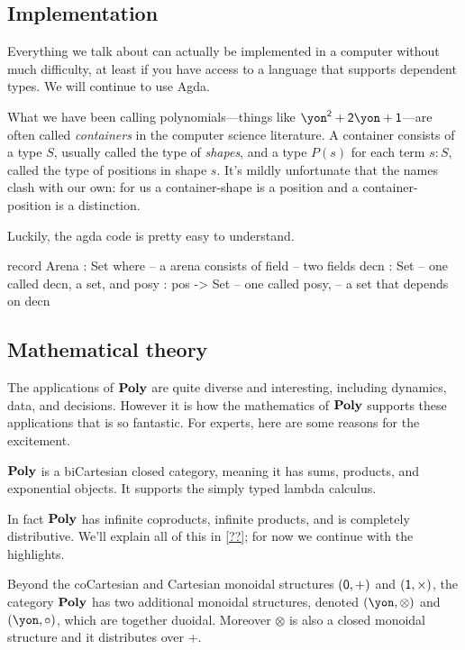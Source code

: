 \documentclass[DynamicalBook]{subfiles}
\begin{document}
\subsection{Implementation}

Everything we talk about can actually be implemented in a computer without much difficulty, at least if you have access to a language that supports dependent types. We will continue to use Agda.

What we have been calling polynomials---things like $\yon^\2+\2\yon+\1$---are often called \emph{containers} in the computer science literature. A container consists of a type $S$, usually called the type of \emph{shapes}, and a type $P(s)$ for each term $s:S$, called the type of positions in shape $s$. It's mildly unfortunate that the names clash with our own: for us a container-shape is a position and a container-position is a distinction.

Luckily, the agda code is pretty easy to understand.
\begin{agda}
record Arena : Set where  -- a arena consists of 
   field                       -- two fields
     decn : Set                -- one called decn, a set, and
     posy : pos -> Set         -- one called posy,
                               -- a set that depends on decn
\end{agda}  

\subsection{Mathematical theory}\label{subsec.math_theory}

The applications of $\textbf{Poly}$ are quite diverse and interesting, including dynamics, data, and decisions. However it is how the mathematics of $\textbf{Poly}$ supports these applications that is so fantastic. For experts, here are some reasons for the excitement.

\begin{proposition}
$\textbf{Poly}$ is a biCartesian closed category, meaning it has sums, products, and exponential objects. It supports the simply typed lambda calculus.
\end{proposition}

In fact $\textbf{Poly}$ has infinite coproducts, infinite products, and is completely distributive. We'll explain all of this in \cref{??}; for now we continue with the highlights.

\begin{proposition}
Beyond the coCartesian and Cartesian monoidal structures $(\textsf{0},+)$ and $(\textsf{1},\times)$, the category $\textbf{Poly}$ has two additional monoidal structures, denoted $(\yon,\otimes)$ and $(\yon,\circ)$, which are together duoidal. Moreover $\otimes$ is also a closed monoidal structure and it distributes over $+$.
\end{proposition}
\end{document}
